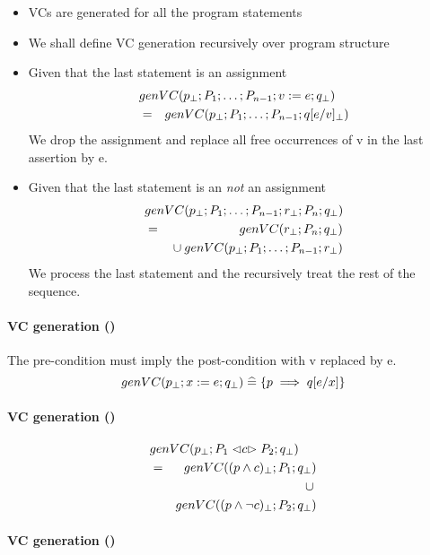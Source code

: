 \begin{itemize}
  \item VCs are generated for all the program statements
  \item We shall define VC generation recursively over program structure
  \item
    Given that the last statement is an assignment
    \begin{eqnarray*}
          \lefteqn{genVC( \assrt p; P_1;\ldots;P_{n-1};v:=e;\assrt q)}
        \\ &=& genVC( p_\bot; P_1;\ldots;P_{n-1};q[e/v]_\bot)
    \end{eqnarray*}
    We drop the assignment and replace all free occurrences of \m v
    in the last assertion by \m e.
  \item
    Given that the last statement is an \emph{not} an assignment
    \begin{eqnarray*}
      \lefteqn{genVC( \assrt p; P_1;\ldots;P_{n-1};\assrt r;P_n;\assrt q)}
    \\ &=& genVC(\assrt r;P_n;\assrt q)
    \\ && {} \cup genVC( \assrt p; P_1;\ldots;P_{n-1};\assrt r)
    \end{eqnarray*}
    We process the last statement
    and the recursively treat the rest of the sequence.
\end{itemize}

\paragraph{VC generation (\m{:=})}

The pre-condition must imply the post-condition with \m v replaced by \m e.
$$genVC(p_\bot;x:=e;q_\bot) \mathrel{\widehat=} \{{ p \implies q[e/x] }\}$$


\paragraph{VC generation (\m{\cond{}})}

\begin{eqnarray*}
      \lefteqn{genVC(\assrt p; P_1 \cond c P_2 ; \assrt q)}
    \\ &=& genVC( \assrt{(p \land c)};P_1;\assrt q )
    \\ && {} \cup {}
    \\ && genVC( \assrt{(p \land \lnot c)};P_2;\assrt q )
\end{eqnarray*}

\paragraph{VC generation (\m{\whl})}

